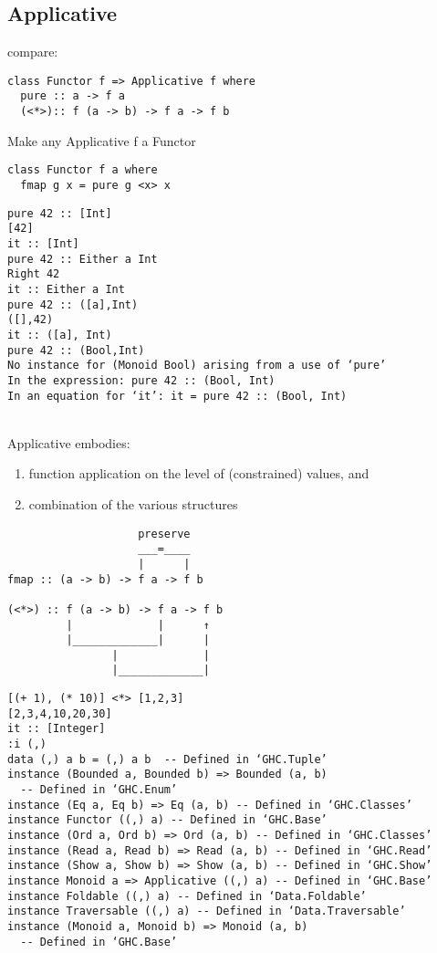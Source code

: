 \documentclass{article}
\newcommand{\Haskell}[1]{\texttt{#1}}
\begin{document}
\subsection{Applicative}
compare:
\begin{verbatim}
class Functor f => Applicative f where
  pure :: a -> f a
  (<*>):: f (a -> b) -> f a -> f b
\end{verbatim}
Make any Applicative f a Functor
\begin{verbatim}
class Functor f a where
  fmap g x = pure g <x> x
\end{verbatim}
\begin{verbatim}
pure 42 :: [Int]
[42]
it :: [Int]
pure 42 :: Either a Int
Right 42
it :: Either a Int
pure 42 :: ([a],Int)
([],42)
it :: ([a], Int)
pure 42 :: (Bool,Int)
No instance for (Monoid Bool) arising from a use of ‘pure’
In the expression: pure 42 :: (Bool, Int)
In an equation for ‘it’: it = pure 42 :: (Bool, Int)
\end{verbatim}
\\Applicative embodies:
\begin{enumerate}[1.]
\item function application on the level of (constrained) values, and
\item combination of the various structures
\end{enumerate}
\begin{verbatim}
                    preserve
                    ___=____
                    |      |
fmap :: (a -> b) -> f a -> f b

(<*>) :: f (a -> b) -> f a -> f b
         |             |      ↑
         |_____________|      |
                |             |
                |_____________|
\end{verbatim}
\begin{verbatim}
[(+ 1), (* 10)] <*> [1,2,3]
[2,3,4,10,20,30]
it :: [Integer]
:i (,)
data (,) a b = (,) a b 	-- Defined in ‘GHC.Tuple’
instance (Bounded a, Bounded b) => Bounded (a, b)
  -- Defined in ‘GHC.Enum’
instance (Eq a, Eq b) => Eq (a, b) -- Defined in ‘GHC.Classes’
instance Functor ((,) a) -- Defined in ‘GHC.Base’
instance (Ord a, Ord b) => Ord (a, b) -- Defined in ‘GHC.Classes’
instance (Read a, Read b) => Read (a, b) -- Defined in ‘GHC.Read’
instance (Show a, Show b) => Show (a, b) -- Defined in ‘GHC.Show’
instance Monoid a => Applicative ((,) a) -- Defined in ‘GHC.Base’
instance Foldable ((,) a) -- Defined in ‘Data.Foldable’
instance Traversable ((,) a) -- Defined in ‘Data.Traversable’
instance (Monoid a, Monoid b) => Monoid (a, b)
  -- Defined in ‘GHC.Base’
\end{verbatim}
\end{document}
